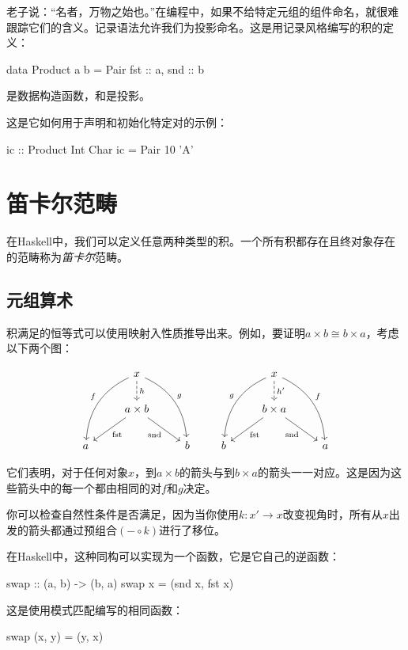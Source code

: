 \documentclass[DaoFP]{subfiles}
\begin{document}
老子说：“名者，万物之始也。”在编程中，如果不给特定元组的组件命名，就很难跟踪它们的含义。记录语法允许我们为投影命名。这是用记录风格编写的积的定义：
\begin{haskell}
data Product a b = Pair { fst :: a, snd :: b }
\end{haskell}
是数据构造函数，和是投影。

这是它如何用于声明和初始化特定对的示例：
\begin{haskell}
ic :: Product Int Char
ic = Pair 10 'A'
\end{haskell}

\section{笛卡尔范畴}

在Haskell中，我们可以定义任意两种类型的积。一个所有积都存在且终对象存在的范畴称为\emph{笛卡尔}范畴。

\subsection{元组算术}

积满足的恒等式可以使用映射入性质推导出来。例如，要证明$a \times b \cong b \times a$，考虑以下两个图：

\[
 \begin{tikzcd}
 &x
 \arrow[d, dashed, "h"]
 \arrow[ddl, bend right, "f"']
 \arrow[ddr, bend left, "g"]
 \\
 & a \times b
  \arrow[dl,  "\text{fst}"]
 \arrow[dr,   "\text{snd}"']
 \\
a && b
 \end{tikzcd}
 \qquad
 \begin{tikzcd}
 &x
 \arrow[d, dashed, "h'"]
 \arrow[ddl, bend right, "g"']
 \arrow[ddr, bend left, "f"]
 \\
 & b \times a
  \arrow[dl,  "\text{fst}"]
 \arrow[dr,   "\text{snd}"']
\\
b && a
  \end{tikzcd}
\]

它们表明，对于任何对象$x$，到$a \times b$的箭头与到$b \times a$的箭头一一对应。这是因为这些箭头中的每一个都由相同的对$f$和$g$决定。

你可以检查自然性条件是否满足，因为当你使用$k \colon x' \to x$改变视角时，所有从$x$出发的箭头都通过预组合$(- \circ k)$进行了移位。

在Haskell中，这种同构可以实现为一个函数，它是它自己的逆函数：
\begin{haskell}
swap :: (a, b) -> (b, a)
swap x = (snd x, fst x)
\end{haskell}
这是使用模式匹配编写的相同函数：
\begin{haskell}
swap (x, y) = (y, x)
\end{haskell}
\end{document}

